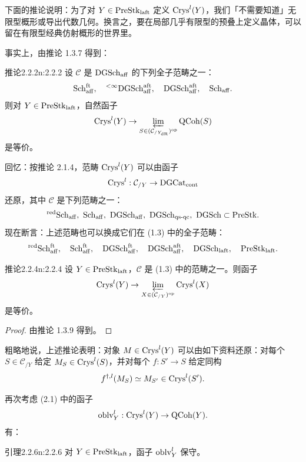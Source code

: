 下面的推论说明：为了对 $Y\in\mathrm{PreStk}_{\mathrm{laft}}$ 定义 $\mathrm{Crys}^l(Y)$，我们「不需要知道」无限型概形或导出代数几何。换言之，要在局部几乎有限型的预叠上定义晶体，可以留在有限型经典仿射概形的世界里。

事实上，由推论 1.3.7 得到：

\begin{othm}{推论}{2.2.2}{n:2.2.2}
设 $\mathcal{C}$ 是 $\mathrm{DGSch}_{\mathrm{aff}}$ 的下列全子范畴之一：
\[
\mathrm{Sch}_{\mathrm{aff}}^{\mathrm{ft}},\quad {}^{<\infty}\mathrm{DGSch}_{\mathrm{aff}}^{\mathrm{aft}},\quad \mathrm{DGSch}_{\mathrm{aff}}^{\mathrm{aft}},\quad \mathrm{Sch}_{\mathrm{aff}}.
\]
则对 $Y\in\mathrm{PreStk}_{\mathrm{laft}}$，自然函子
\[
\mathrm{Crys}^l(Y)\to\varprojlim_{S\in(\mathcal{C}_{/Y_{\mathrm{dR}}})^{\mathrm{op}}}\mathrm{QCoh}(S)
\]
是等价。
\end{othm}

回忆：按推论 2.1.4，范畴 $\mathrm{Crys}^l(Y)$ 可以由函子
\[
\mathrm{Crys}^l:\mathcal{C}_{/Y}\to\mathrm{DGCat}_{\mathrm{cont}}
\]
还原，其中 $\mathcal{C}$ 是下列范畴之一：
\[
{}^{\mathrm{red}}\Sch_{\mathrm{aff}},\ \Sch_{\mathrm{aff}},\ \DGSch_{\mathrm{aff}},\ \DGSch_{\mathrm{qs\text{-}qc}},\ \DGSch\subset\PreStk.
\]
现在断言：上述范畴也可以换成它们在 (1.3) 中的全子范畴：
\[
{}^{\mathrm{red}}\mathrm{Sch}_{\mathrm{aff}}^{\mathrm{ft}},\quad \mathrm{Sch}_{\mathrm{aff}}^{\mathrm{ft}},\quad \mathrm{DGSch}_{\mathrm{aff}}^{\mathrm{ft}},\quad \mathrm{DGSch}_{\mathrm{aff}}^{\mathrm{aft}},\quad \mathrm{DGSch}_{\mathrm{laft}},\quad \mathrm{PreStk}_{\mathrm{laft}}.
\]

\begin{othm}{推论}{2.2.4}{n:2.2.4}
设 $Y\in\mathrm{PreStk}_{\mathrm{laft}}$，$\mathcal{C}$ 是 (1.3) 中的范畴之一。则函子
\[
\mathrm{Crys}^l(Y)\to\varprojlim_{X\in(\mathcal{C}_{/Y})^{\mathrm{op}}}\mathrm{Crys}^l(X)
\]
是等价。
\end{othm}

\begin{proof}
由推论 1.3.9 得到。
\end{proof}

粗略地说，上述推论表明：对象 $M\in\mathrm{Crys}^l(Y)$ 可以由如下资料还原：对每个 $S\in\mathcal{C}_{/Y}$ 给定 $M_S\in\mathrm{Crys}^l(S)$，并对每个 $f:S'\to S$ 给定同构
\[
f^{\dagger,l}(M_S)\simeq M_{S'}\in\mathrm{Crys}^l(S').
\]

再次考虑 (2.1) 中的函子
\[
\mathrm{oblv}^l_Y:\mathrm{Crys}^l(Y)\to\mathrm{QCoh}(Y).
\]
有：

\begin{othm}{引理}{2.2.6}{n:2.2.6}
对 $Y\in\mathrm{PreStk}_{\mathrm{laft}}$，函子 $\mathrm{oblv}^l_Y$ 保守。
\end{othm}

